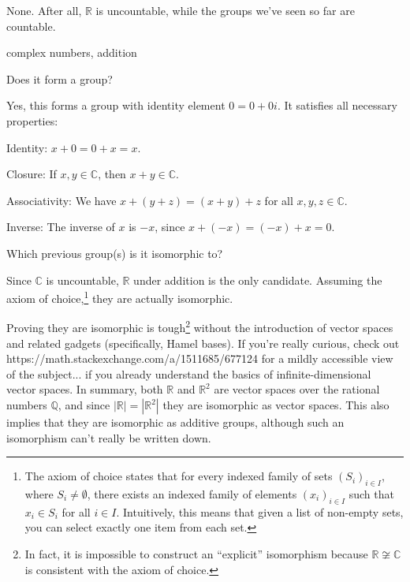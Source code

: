 \documentclass[../key.tex]{subfiles}
\begin{document}
\noindent None. After all, $\mathbb{R}$ is uncountable, while the groups we've seen so far are countable.

\begin{inner_problem}
\item complex numbers, addition
\end{inner_problem}

\begin{iinner_problem}[start=1]
\item Does it form a group?
\end{iinner_problem}

\noindent Yes, this forms a group with identity element $0=0+0i$. It satisfies all necessary properties:

Identity: $x+0=0+x=x$.

Closure: If $x,y\in \mathbb{C}$, then $x+y\in \mathbb{C}$.

Associativity: We have $x+(y+z)=(x+y)+z$ for all $x,y,z \in \mathbb{C}$.

Inverse: The inverse of $x$ is $-x$, since $x+(-x)=(-x)+x=0$.

\begin{iinner_problem}
\item Which previous group(s) is it isomorphic to?
\end{iinner_problem}

\noindent Since $\mathbb{C}$ is uncountable, $\mathbb{R}$ under addition is the only candidate. Assuming the axiom of choice,\footnote{The axiom of choice states that for every indexed family of sets $(S_i)_{i\in I}$, where $S_i\neq \emptyset$, there exists an indexed family of elements $(x_i)_{i\in I}$ such that $x_i\in S_i$ for all $i\in I$. Intuitively, this means that given a list of non-empty sets, you can select exactly one item from each set.} they are actually isomorphic. 

Proving they are isomorphic is tough\footnote{In fact, it is impossible to construct an ``explicit'' isomorphism because $\mathbb{R} \not \cong \mathbb{C}$ is consistent with the axiom of choice.} without the introduction of vector spaces and related gadgets (specifically, Hamel bases).  If you're really curious, check out https://math.stackexchange.com/a/1511685/677124 for a mildly accessible view of the subject... if you already understand the basics of infinite-dimensional vector spaces. In summary, both $\mathbb{R}$ and $\mathbb{R}^2$ are vector spaces over the rational numbers $\mathbb{Q}$, and since $|\mathbb{R}|=|\mathbb{R}^2|$ they are isomorphic as vector spaces. This also implies that they are isomorphic as additive groups, although such an isomorphism can't really be written down.
\end{document}
